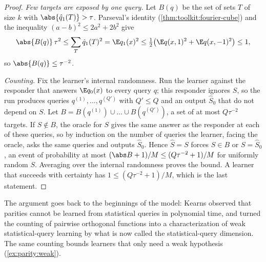 \begin{refsection}
\begin{proof}
\emph{Few targets are exposed by one query.} Let $B(q)$ be the set of sets $T$ of size $k$ with $\abs{\hat q_1(T)}>\tau$. Parseval's identity (\cref{thm:toolkit:fourier-cube}) and the inequality $(a-b)^2\le2a^2+2b^2$ give
\[
  \abs{B(q)}\,\tau^2\le\sum_{T}\hat q_1(T)^2=\E q_1(x)^2\le\tfrac12\bigl(\E q(x,1)^2+\E q(x,-1)^2\bigr)\le1,
\]
so $\abs{B(q)}\le\tau^{-2}$.

\emph{Counting.} Fix the learner's internal randomness. Run the learner against the responder that answers $\E q_0(x)$ to every query $q$; this responder ignores $S$, so the run produces queries $q^{(1)},\dots,q^{(Q')}$ with $Q'\le Q$ and an output $\hat S_0$ that do not depend on $S$. Let $B=B(q^{(1)})\cup\dots\cup B(q^{(Q')})$, a set of at most $Q\tau^{-2}$ targets. If $S\notin B$, the oracle for $S$ gives the same answer as the responder at each of these queries, so by induction on the number of queries the learner, facing the oracle, asks the same queries and outputs $\hat S_0$. Hence $\hat S=S$ forces $S\in B$ or $S=\hat S_0$, an event of probability at most $(\abs B+1)/M\le(Q\tau^{-2}+1)/M$ for uniformly random $S$. Averaging over the internal randomness proves the bound. A learner that succeeds with certainty has $1\le(Q\tau^{-2}+1)/M$, which is the last statement.
\end{proof}

The argument goes back to the beginnings of the model: Kearns observed that parities cannot be learned from statistical queries in polynomial time, and \textcite{BlumEtAl1994} turned the counting of pairwise orthogonal functions into a characterization of weak statistical-query learning by what is now called the statistical-query dimension. The same counting bounds learners that only need a weak hypothesis (\cref{ex:parity:weak}).


\end{refsection}
